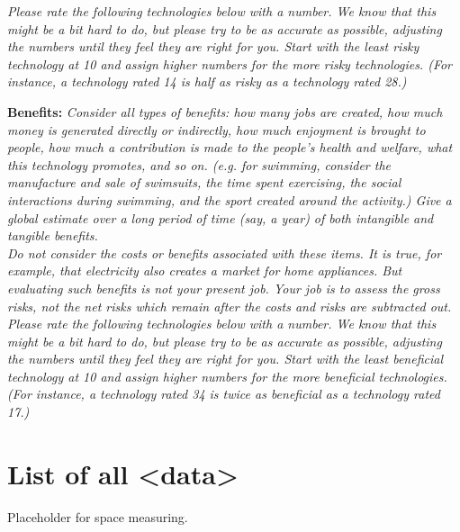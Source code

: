 \documentclass{acm_proc_article-sp}
\begin{document}
\textit{Please rate the following technologies below with a number. We know that this might be a bit hard to do, but please try to be as accurate as possible, adjusting the numbers until they feel they are right for you. Start with the least risky technology at 10 and assign higher numbers for the more risky technologies. (For instance, a technology rated 14 is half as risky as a technology rated 28.)}

{\bf Benefits:} \textit{Consider all types of benefits: how many jobs are created, how much money is generated directly or indirectly, how much enjoyment is brought to people, how much a contribution is made to the people's health and welfare, what this technology promotes, and so on. (e.g. for swimming, consider the manufacture and sale of swimsuits, the time spent exercising, the social interactions during swimming, and the sport created around the activity.) Give a global estimate over a long period of time (say, a year) of both intangible and tangible benefits.} \\[-.6cm]

\textit{Do not consider the costs or benefits associated with these items. It is true, for example, that electricity also creates a market for home appliances. But evaluating such benefits is not your present job. Your job is to assess the gross risks, not the net risks which remain after the costs and risks are subtracted out.} \\[-.6cm]

\textit{Please rate the following technologies below with a number. We know that this might be a bit hard to do, but please try to be as accurate as possible, adjusting the numbers until they feel they are right for you. Start with the least beneficial technology at 10 and assign higher numbers for the more beneficial technologies. (For instance, a technology rated 34 is twice as beneficial as a technology rated 17.)}

\section{List of all <data>}
{\color{red} Placeholder for space measuring.} \\[-.8cm]
\end{document}
